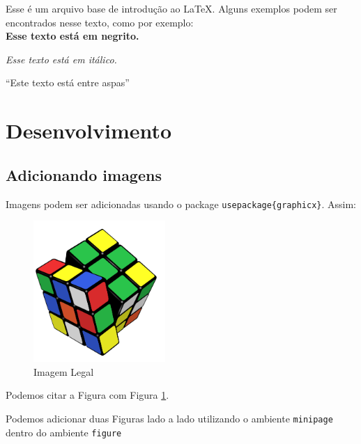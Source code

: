 \documentclass[11pt,a4paper]{article}
\begin{document}
Esse é um arquivo base de introdução ao LaTeX. Alguns exemplos podem ser encontrados nesse texto, como por exemplo:
\\

\textbf{Esse texto está em negrito.}

\textit{Esse texto está em itálico.}

``Este texto está entre aspas''


\section{Desenvolvimento}

\subsection{Adicionando imagens}

Imagens podem ser adicionadas usando o package \texttt{usepackage\{graphicx\}}. Assim:

\begin{figure}[!ht] %
\centering
	\includegraphics[width=5cm]{rubiks.png}
	\caption{Imagem Legal}
	\label{fig:cube}
\end{figure}

Podemos citar a Figura com Figura \ref{fig:cube}.

Podemos adicionar duas Figuras lado a lado utilizando o ambiente \texttt{minipage} dentro do ambiente \texttt{figure}
\end{document}
